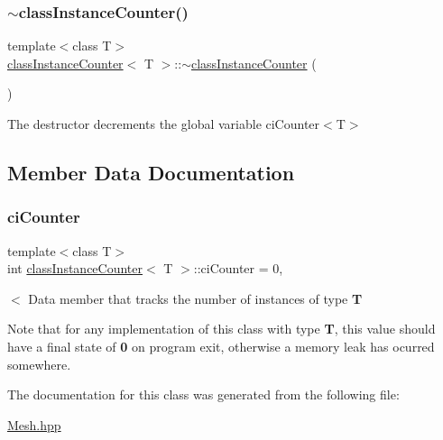 \subsubsection{\texorpdfstring{$\sim$class\+Instance\+Counter()}{~classInstanceCounter()}}
{\footnotesize\ttfamily template$<$class T$>$ \\
\mbox{\hyperlink{classclass_instance_counter}{class\+Instance\+Counter}}$<$ T $>$\+::$\sim$\mbox{\hyperlink{classclass_instance_counter}{class\+Instance\+Counter}} (\begin{DoxyParamCaption}{ }\end{DoxyParamCaption})\hspace{0.3cm}{\ttfamily [inline]}}



The destructor decrements the global variable ci\+Counter$<$\+T$>$ 



\subsection{Member Data Documentation}
\mbox{\label{classclass_instance_counter_a990f94f1650bb05ade3f4deba9110806}} 
\subsubsection{\texorpdfstring{ci\+Counter}{ciCounter}}
{\footnotesize\ttfamily template$<$class T$>$ \\
int \mbox{\hyperlink{classclass_instance_counter}{class\+Instance\+Counter}}$<$ T $>$\+::ci\+Counter = 0\hspace{0.3cm}{\ttfamily [static]}, {\ttfamily [protected]}}



$<$ Data member that tracks the number of instances of type {\bfseries T} 

Note that for any implementation of this class with type {\bfseries T}, this value should have a final state of {\bfseries 0} on program exit, otherwise a memory leak has ocurred somewhere. 

The documentation for this class was generated from the following file\+:\begin{DoxyCompactItemize}
\item 
\mbox{\hyperlink{_mesh_8hpp}{Mesh.\+hpp}}\end{DoxyCompactItemize}
